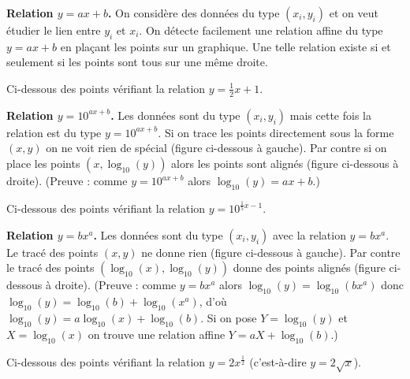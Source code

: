 \documentclass[11pt,class=report,crop=false]{standalone}
\begin{document}

\begin{cours}

\textbf{Relation $y=ax+b$.}
On considère des données du type $(x_i,y_i)$ et on veut étudier le lien entre $y_i$ et $x_i$.
On détecte facilement une relation affine du type $y=ax+b$ en plaçant les points sur un graphique. Une telle relation existe si et seulement si les points sont tous sur une même droite.


Ci-dessous des points vérifiant la relation $y = \frac12 x +1$.

\textbf{Relation $y=10^{ax+b}$.}
Les données sont du type $(x_i,y_i)$ mais cette fois la relation est du type  $y=10^{ax+b}$.
Si on trace les points directement sous la forme $(x,y)$ on ne voit rien de spécial (figure ci-dessous à gauche). Par contre si on place les points $(x,\log_{10}(y))$ alors les points sont alignés (figure ci-dessous à droite). (Preuve : comme $y=10^{ax+b}$ alors $\log_{10}(y) = ax+b$.)

Ci-dessous des points vérifiant la relation $y = 10^{\tfrac15 x -1}$.


\textbf{Relation $y=b x^a$.}
Les données sont du type $(x_i,y_i)$ avec la relation $y=bx^a$.
Le tracé des points $(x,y)$ ne donne rien (figure ci-dessous à gauche). 
Par contre le tracé des points $(\log_{10}(x),\log_{10}(y))$ donne des points alignés (figure ci-dessous à droite). (Preuve : comme $y=bx^a$ alors $\log_{10}(y) = \log_{10}(bx^a)$ donc
$\log_{10}(y) = \log_{10}(b) + \log_{10}(x^a)$, d'où $\log_{10}(y) = a\log_{10}(x)+\log_{10}(b)$. Si on pose $Y=\log_{10}(y)$ et $X=\log_{10}(x)$ on trouve une relation affine $Y=aX+ \log_{10}(b)$.)


Ci-dessous des points vérifiant la relation $y = 2x^{\frac12}$ (c'est-à-dire $y=2\sqrt{x}$).


\end{cours}


\end{document}
